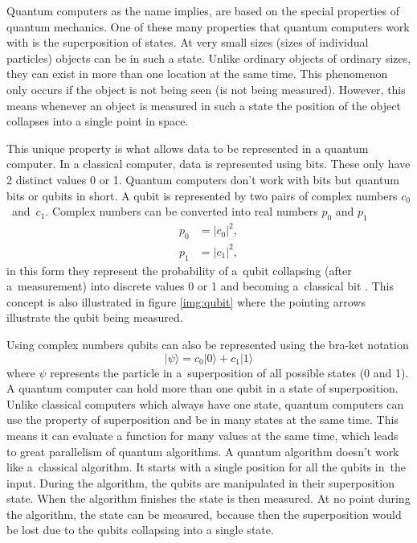 Quantum computers as the name implies, are based on the special properties of quantum mechanics. One of these many properties that quantum computers work with is the superposition of states. At very small sizes (sizes of individual particles) objects can be in such a state. Unlike ordinary objects of ordinary sizes, they can exist in more than one location at the same time. This phenomenon only occurs if the object is not being seen (is not being measured). However, this means whenever an object is measured in such a state the position of the object collapses into a single point in space. \cite{Yanofsky2008}


This unique property is what allows data to be represented in a quantum computer. In a classical computer, data is represented using bits. These only have 2 distinct values 0 or 1. Quantum computers don't work with bits but quantum bits or qubits in short. A qubit is represented by two pairs of complex numbers $c_0$~and~$c_1$. Complex numbers can be converted into real numbers $p_0$ and $p_1$
\begin{equation}
  \begin{aligned}
    p_0 &= \lvert c_0 \rvert^2, \\
    p_1 &= \lvert c_1 \rvert^2,
  \end{aligned}
\end{equation}
in this form they represent the probability of a~qubit collapsing (after a~measurement) into discrete values 0 or 1 and becoming a~classical bit \cite{Yanofsky2008}. This concept is also illustrated in figure \ref{img:qubit} where the pointing arrows illustrate the qubit being measured.

Using complex numbers qubits can also be represented using the bra-ket notation
\begin{equation}
  \lvert\psi\rangle=c_0|0\rangle + c_1|1\rangle
\end{equation}
where $\psi$ represents the particle in a~superposition of all possible states (0 and 1). A quantum computer can hold more than one qubit in a state of superposition. Unlike classical computers which always have one state, quantum computers can use the property of superposition and be in many states at the same time. This means it can evaluate a function for many values at the same time, which leads to great parallelism of quantum algorithms. A quantum algorithm doesn't work like a~classical algorithm. It starts with a single position for all the qubits in~the input. During the algorithm, the qubits are manipulated in their superposition state. When the algorithm finishes the state is then measured. At no point during the algorithm, the state can be measured, because then the superposition would be lost due to the qubits collapsing into a single state. \cite{Yanofsky2008}
